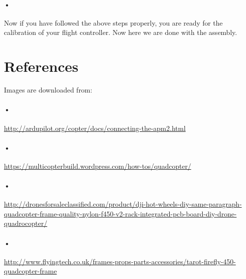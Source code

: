 \documentclass[11pt,a4paper]{article}
\begin{document}
	\paragraph{•}
	Now if you have followed the above steps properly, you are ready for the calibration of your flight controller. Now here we are done with the assembly.
	\section{References}
	Images are downloaded from:
	\paragraph{•}
	\url{http://ardupilot.org/copter/docs/connecting-the-apm2.html}
	\paragraph{•}\url{https://multicopterbuild.wordpress.com/how-tos/quadcopter/}
	\paragraph{•}\url{http://dronesforsaleclassified.com/product/dji-hot-wheels-diy-same-paragraph-quadcopter-frame-quality-nylon-f450-v2-rack-integrated-pcb-board-diy-drone-quadrocopter/}
	\paragraph{•}\url{http://www.flyingtech.co.uk/frames-props-parts-accessories/tarot-firefly-450-quadcopter-frame}
	
\end{document}

